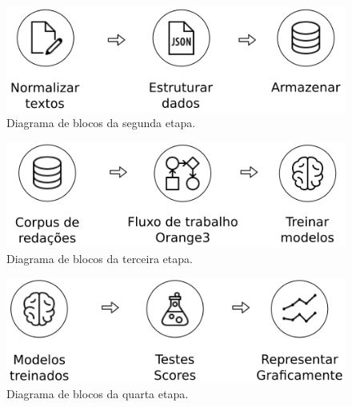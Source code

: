 \begin{figure}[h]
\begin{center}
    \includegraphics[scale=0.75]{figuras/metodologia_2.png}
\end{center}
\caption{Diagrama de blocos da segunda etapa.}
\label{Img:3DRobotWorkspace}
\end{figure}

\begin{figure}[h]
\begin{center}
    \includegraphics[scale=0.75]{figuras/metodologia_3.png}
\end{center}
\caption{Diagrama de blocos da terceira etapa.}
\label{Img:3DRobotWorkspace}
\end{figure}

\begin{figure}[h]
\begin{center}
    \includegraphics[scale=0.75]{figuras/metodologia_4.png}
\end{center}
\caption{Diagrama de blocos da quarta etapa.}
\label{Img:3DRobotWorkspace}
\end{figure}




